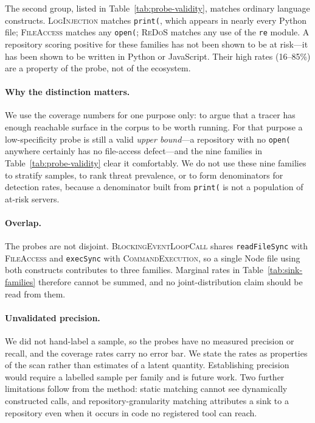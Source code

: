 The second group, listed in Table~\ref{tab:probe-validity}, matches ordinary
language constructs. \textsc{LogInjection} matches \texttt{print(}, which
appears in nearly every Python file; \textsc{FileAccess} matches any
\texttt{open(}; \textsc{ReDoS} matches any use of the \texttt{re} module.
A repository scoring positive for these families has not been shown to be at
risk---it has been shown to be written in Python or JavaScript. Their high
rates (16--85\%) are a property of the probe, not of the ecosystem.

\paragraph{Why the distinction matters.}
We use the coverage numbers for one purpose only: to argue that a tracer has
enough reachable surface in the corpus to be worth running. For that purpose
a low-specificity probe is still a valid \emph{upper bound}---a repository
with no \texttt{open(} anywhere certainly has no file-access defect---and the
nine families in Table~\ref{tab:probe-validity} clear it comfortably. We do
not use these nine families to stratify samples, to rank threat prevalence,
or to form denominators for detection rates, because a denominator built from
\texttt{print(} is not a population of at-risk servers.

\paragraph{Overlap.}
The probes are not disjoint. \textsc{BlockingEventLoopCall} shares
\texttt{readFileSync} with \textsc{FileAccess} and \texttt{execSync} with
\textsc{CommandExecution}, so a single Node file using both constructs
contributes to three families. Marginal rates in
Table~\ref{tab:sink-families} therefore cannot be summed, and no
joint-distribution claim should be read from them.

\paragraph{Unvalidated precision.}
We did not hand-label a sample, so the probes have no measured precision or
recall, and the coverage rates carry no error bar. We state the rates as
properties of the scan rather than estimates of a latent quantity.
Establishing precision would require a labelled sample per family and is
future work. Two further limitations follow from the method: static matching
cannot see dynamically constructed calls, and repository-granularity matching
attributes a sink to a repository even when it occurs in code no registered
tool can reach.

